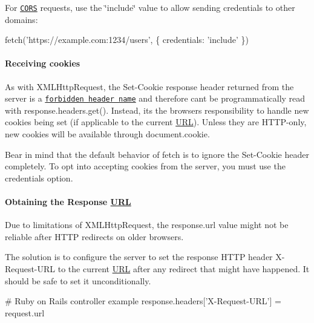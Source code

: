 For \href{https://developer.mozilla.org/en-US/docs/Web/HTTP/Access_control_CORS}{\tt C\+O\+RS} requests, use the \char`\"{}include\char`\"{} value to allow sending credentials to other domains\+:


\begin{DoxyCode}
fetch('https://example.com:1234/users', \{
  credentials: 'include'
\})
\end{DoxyCode}


\paragraph*{Receiving cookies}

As with X\+M\+L\+Http\+Request, the {\ttfamily Set-\/\+Cookie} response header returned from the server is a \href{https://developer.mozilla.org/en-US/docs/Glossary/Forbidden_header_name}{\tt forbidden header name} and therefore can\textquotesingle{}t be programmatically read with {\ttfamily response.\+headers.\+get()}. Instead, it\textquotesingle{}s the browser\textquotesingle{}s responsibility to handle new cookies being set (if applicable to the current \mbox{\hyperlink{namespace_u_r_l}{U\+RL}}). Unless they are H\+T\+T\+P-\/only, new cookies will be available through {\ttfamily document.\+cookie}.

Bear in mind that the default behavior of {\ttfamily fetch} is to ignore the {\ttfamily Set-\/\+Cookie} header completely. To opt into accepting cookies from the server, you must use the {\ttfamily credentials} option.

\paragraph*{Obtaining the Response \mbox{\hyperlink{namespace_u_r_l}{U\+RL}}}

Due to limitations of X\+M\+L\+Http\+Request, the {\ttfamily response.\+url} value might not be reliable after H\+T\+TP redirects on older browsers.

The solution is to configure the server to set the response H\+T\+TP header {\ttfamily X-\/\+Request-\/\+U\+RL} to the current \mbox{\hyperlink{namespace_u_r_l}{U\+RL}} after any redirect that might have happened. It should be safe to set it unconditionally.


\begin{DoxyCode}
# Ruby on Rails controller example
response.headers['X-Request-URL'] = request.url
\end{DoxyCode}



